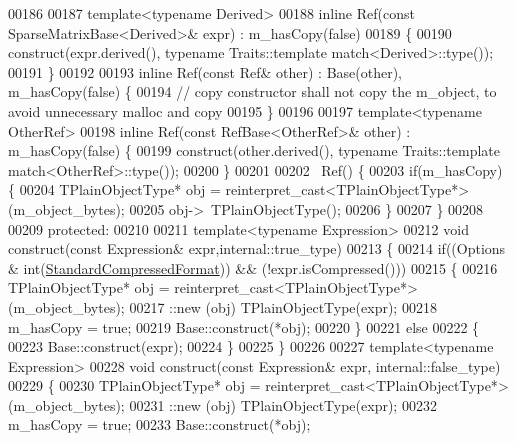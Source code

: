 \begin{DoxyCode}
00186 
00187     \textcolor{keyword}{template}<\textcolor{keyword}{typename} Derived>
00188     \textcolor{keyword}{inline} Ref(\textcolor{keyword}{const} SparseMatrixBase<Derived>& expr) : m\_hasCopy(false)
00189     \{
00190       construct(expr.derived(), \textcolor{keyword}{typename} Traits::template match<Derived>::type());
00191     \}
00192 
00193     \textcolor{keyword}{inline} Ref(\textcolor{keyword}{const} Ref& other) : Base(other), m\_hasCopy(false) \{
00194       \textcolor{comment}{// copy constructor shall not copy the m\_object, to avoid unnecessary malloc and copy}
00195     \}
00196 
00197     \textcolor{keyword}{template}<\textcolor{keyword}{typename} OtherRef>
00198     \textcolor{keyword}{inline} Ref(\textcolor{keyword}{const} RefBase<OtherRef>& other) : m\_hasCopy(false) \{
00199       construct(other.derived(), \textcolor{keyword}{typename} Traits::template match<OtherRef>::type());
00200     \}
00201 
00202     ~Ref() \{
00203       \textcolor{keywordflow}{if}(m\_hasCopy) \{
00204         TPlainObjectType* obj = \textcolor{keyword}{reinterpret\_cast<}TPlainObjectType*\textcolor{keyword}{>}(m\_object\_bytes);
00205         obj->~TPlainObjectType();
00206       \}
00207     \}
00208 
00209   \textcolor{keyword}{protected}:
00210 
00211     \textcolor{keyword}{template}<\textcolor{keyword}{typename} Expression>
00212     \textcolor{keywordtype}{void} construct(\textcolor{keyword}{const} Expression& expr,internal::true\_type)
00213     \{
00214       \textcolor{keywordflow}{if}((Options & \textcolor{keywordtype}{int}(\hyperlink{namespace_eigen_a668ffb0fb66c55c1c98bd35c52df648eaf81fc519ed9cc0ebc6aac69a366086a5}{StandardCompressedFormat})) && (!expr.isCompressed()))
00215       \{
00216         TPlainObjectType* obj = \textcolor{keyword}{reinterpret\_cast<}TPlainObjectType*\textcolor{keyword}{>}(m\_object\_bytes);
00217         ::new (obj) TPlainObjectType(expr);
00218         m\_hasCopy = \textcolor{keyword}{true};
00219         Base::construct(*obj);
00220       \}
00221       \textcolor{keywordflow}{else}
00222       \{
00223         Base::construct(expr);
00224       \}
00225     \}
00226 
00227     \textcolor{keyword}{template}<\textcolor{keyword}{typename} Expression>
00228     \textcolor{keywordtype}{void} construct(\textcolor{keyword}{const} Expression& expr, internal::false\_type)
00229     \{
00230       TPlainObjectType* obj = \textcolor{keyword}{reinterpret\_cast<}TPlainObjectType*\textcolor{keyword}{>}(m\_object\_bytes);
00231       ::new (obj) TPlainObjectType(expr);
00232       m\_hasCopy = \textcolor{keyword}{true};
00233       Base::construct(*obj);

\end{DoxyCode}
